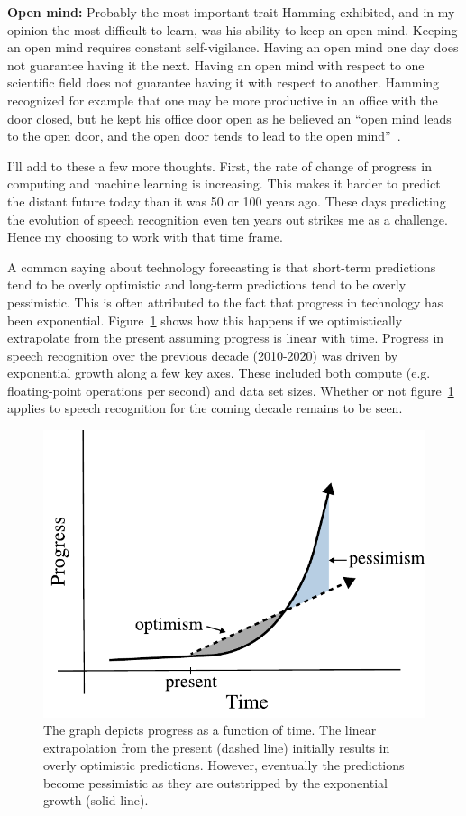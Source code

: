 {\bf Open mind:} Probably the most important trait Hamming exhibited, and in my
opinion the most difficult to learn, was his ability to keep an open mind.
Keeping an open mind requires constant self-vigilance. Having an open mind one
day does not guarantee having it the next. Having an open mind with respect to
one scientific field does not guarantee having it with respect to another.
Hamming recognized for example that one may be more productive in an office
with the door closed, but he kept his office door open as he believed an ``open
mind leads to the open door, and the open door tends to lead to the open
mind''~\citep[chp. 30]{hamming1997art}.

I'll add to these a few more thoughts. First, the rate of change of progress in
computing and machine learning is increasing. This makes it harder to predict
the distant future today than it was 50 or 100 years ago. These days predicting
the evolution of speech recognition even ten years out strikes me as a
challenge. Hence my choosing to work with that time frame.

A common saying about technology forecasting is that short-term predictions
tend to be overly optimistic and long-term predictions tend to be overly
pessimistic. This is often attributed to the fact that progress in technology
has been exponential. Figure~\ref{fig:exponential_growth} shows how this
happens if we optimistically extrapolate from the present assuming progress is
linear with time. Progress in speech recognition over the previous decade
(2010-2020) was driven by exponential growth along a few key axes. These
included both compute (e.g. floating-point operations per second) and data set
sizes. Whether or not figure~\ref{fig:exponential_growth} applies to speech
recognition for the coming decade remains to be seen.

\begin{figure}
    \centering
    \includegraphics[width=\linewidth]{figures/exponential_growth}
    \caption{The graph depicts progress as a function of time. The linear
    extrapolation from the present (dashed line) initially results in overly
    optimistic predictions.  However, eventually the predictions become
    pessimistic as they are outstripped by the exponential growth (solid
    line).}
    \label{fig:exponential_growth}
\end{figure}

